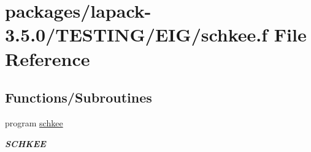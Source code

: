 \hypertarget{schkee_8f}{}\section{packages/lapack-\/3.5.0/\+T\+E\+S\+T\+I\+N\+G/\+E\+I\+G/schkee.f File Reference}
\label{schkee_8f}
\subsection*{Functions/\+Subroutines}
\begin{DoxyCompactItemize}
\item 
program \hyperlink{group__single__eig_gaa05ae9ee47877fe74bea22f30f3e1b41}{schkee}
\begin{DoxyCompactList}\small\item\em {\bfseries S\+C\+H\+K\+E\+E} \end{DoxyCompactList}\end{DoxyCompactItemize}
